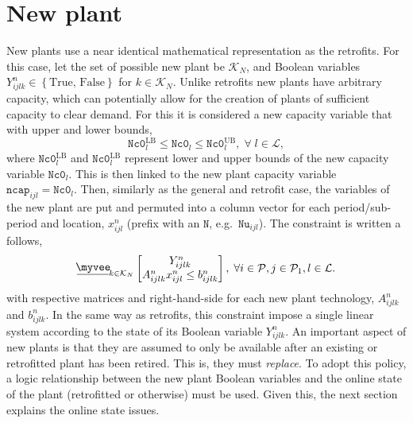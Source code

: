 \documentclass{amsbook}
\newcommand{\myveebar}{\mathbin{\vcenter{\hbox{$ \underline{\mkern-2.4mu{\myvee}\mkern-2.4mu} $}}}}
\begin{document}
\section{New plant}
%
New plants use a near identical mathematical representation as the retrofits.
For this case, let the set of possible new plant be $\mathcal{K}_N$, and Boolean
variables $Y^n_{ijlk} \in \left\{\text{True, False}\right\}$ for $k\in
\mathcal{K}_N$. Unlike retrofits new plants have arbitrary capacity, which can
potentially allow for the creation of plants of sufficient capacity to clear
demand. For this it is considered a new capacity variable that with upper
and lower bounds,
%
\begin{equation}
    \mathtt{Nc0}^{\text{LB}}_l \leq \mathtt{Nc0}_{l} 
    \leq \mathtt{Nc0}^{\text{UB}}_l, \; \forall \; l \in \mathcal{L},
\end{equation}
%
where $\mathtt{Nc0}^{\text{LB}}_l$ and $\mathtt{Nc0}^{\text{LB}}_l$ represent
lower and upper bounds of the new capacity variable $\mathtt{Nc0}_{l}$. This is
then linked to the new plant capacity variable $\mathtt{ncap}_{ijl} =
\mathtt{Nc0}_{l}$. Then, similarly as the general and retrofit case, the
variables of the new plant are put and permuted into a column vector for each
period/sub-period and location, $x^n_{ijl}$ (prefix with an $\mathtt{N}$,
e.g.\ $\mathtt{Nu}_{ijl}$).
The constraint is written a follows,
%
\begin{equation}
    \myveebar_{k \in \mathcal{K}_N}
    \begin{bmatrix}
        Y^n_{ijlk} \\
        A^n_{ijlk} x^n_{ijl} \leq b^n_{ijlk}
    \end{bmatrix}
    , \; \forall i\in \mathcal{P}, j\in \mathcal{P}_1, l\in \mathcal{L}.
\end{equation}
%
with respective matrices and right-hand-side for each new plant technology,
$A^n_{ijlk}$ and $b^n_{ijlk}$. In the same way as retrofits, this constraint
impose a single linear system according to the state of its Boolean variable
$Y^n_{ijlk}$.
%
An important aspect of new plants is that they are assumed to only be
available after an existing or retrofitted plant has been retired. This is, they
must \emph{replace}. To adopt this policy, a logic relationship between the new
plant Boolean variables and the online state of the plant (retrofitted or
otherwise) must be used. Given this, the next section explains the online state
issues.
%
\end{document}
